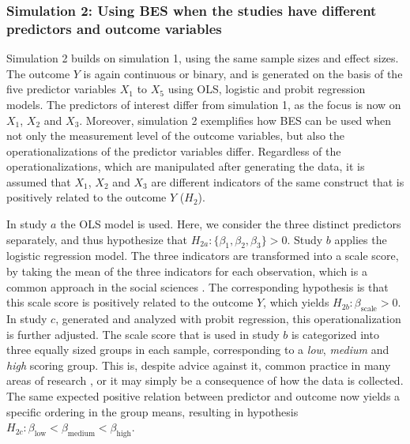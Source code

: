 \documentclass[11pt,reqno]{article}
\begin{document}
\subsubsection{Simulation 2: Using BES when the studies have different predictors and outcome variables}

Simulation 2 builds on simulation 1, using the same sample sizes and effect sizes.
The outcome $Y$ is again continuous or binary, and is generated on the basis of the five predictor variables $X_1$ to $X_5$ using OLS, logistic and probit regression models.
The predictors of interest differ from simulation 1, as the focus is now on $X_1$, $X_2$ and $X_3$.
Moreover, simulation 2 exemplifies how BES can be used when not only the measurement level of the outcome variables, but also the operationalizations of the predictor variables differ.
Regardless of the operationalizations, which are manipulated after generating the data, it is assumed that $X_1$, $X_2$ and $X_3$ are different indicators of the same construct that is positively related to the outcome $Y$ ($H_2$).

In study $a$ the OLS model is used. Here, we consider the three distinct predictors separately, and thus hypothesize that $H_{2a}: \{\beta_1, \beta_2, \beta_3\} > 0$.
Study $b$ applies the logistic regression model. The three indicators are transformed into a scale score, by taking the mean of the three indicators for each observation, which is a common approach in the social sciences \citep[e.g.,][]{bauer_discrepancy_2016}.
The corresponding hypothesis is that this scale score is positively related to the outcome $Y$, which yields $H_{2b}: \beta_{\text{scale}} > 0$.
In study $c$, generated and analyzed with probit regression, this operationalization is further adjusted.
The scale score that is used in study $b$ is categorized into three equally sized groups in each sample, corresponding to a \textit{low}, \textit{medium} and \textit{high} scoring group.
This is, despite advice against it, common practice in many areas of research \citep[e.g.,][]{bennette_against_2012, decoster_best_2011}, or it may simply be a consequence of how the data is collected.
The same expected positive relation between predictor and outcome now yields a specific ordering in the group means, resulting in hypothesis $H_{2c}: \beta_{\text{low}} < \beta_{\text{medium}} < \beta_{\text{high}}$.
\end{document}
